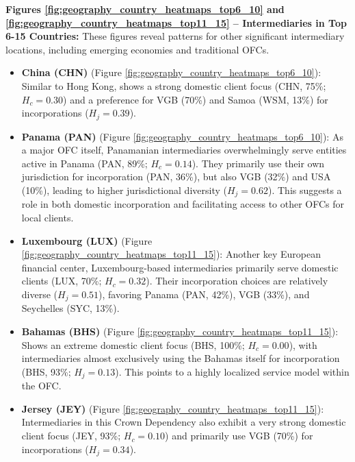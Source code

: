 \textbf{Figures \ref{fig:geography_country_heatmaps_top6_10} and \ref{fig:geography_country_heatmaps_top11_15} – Intermediaries in Top 6-15 Countries:}
These figures reveal patterns for other significant intermediary locations, including emerging economies and traditional OFCs.

\begin{itemize}
    \item \textbf{China (CHN)} (Figure \ref{fig:geography_country_heatmaps_top6_10}): Similar to Hong Kong, shows a strong domestic client focus (CHN, 75\%; $H_c=0.30$) and a preference for VGB (70\%) and Samoa (WSM, 13\%) for incorporations ($H_j=0.39$).

    \item \textbf{Panama (PAN)} (Figure \ref{fig:geography_country_heatmaps_top6_10}): As a major OFC itself, Panamanian intermediaries overwhelmingly serve entities active in Panama (PAN, 89\%; $H_c=0.14$). They primarily use their own jurisdiction for incorporation (PAN, 36\%), but also VGB (32\%) and USA (10\%), leading to higher jurisdictional diversity ($H_j=0.62$). This suggests a role in both domestic incorporation and facilitating access to other OFCs for local clients.

    \item \textbf{Luxembourg (LUX)} (Figure \ref{fig:geography_country_heatmaps_top11_15}): Another key European financial center, Luxembourg-based intermediaries primarily serve domestic clients (LUX, 70\%; $H_c=0.32$). Their incorporation choices are relatively diverse ($H_j=0.51$), favoring Panama (PAN, 42\%), VGB (33\%), and Seychelles (SYC, 13\%).

    \item \textbf{Bahamas (BHS)} (Figure \ref{fig:geography_country_heatmaps_top11_15}): Shows an extreme domestic client focus (BHS, 100\%; $H_c=0.00$), with intermediaries almost exclusively using the Bahamas itself for incorporation (BHS, 93\%; $H_j=0.13$). This points to a highly localized service model within the OFC.

    \item \textbf{Jersey (JEY)} (Figure \ref{fig:geography_country_heatmaps_top11_15}): Intermediaries in this Crown Dependency also exhibit a very strong domestic client focus (JEY, 93\%; $H_c=0.10$) and primarily use VGB (70\%) for incorporations ($H_j=0.34$).
\end{itemize}


